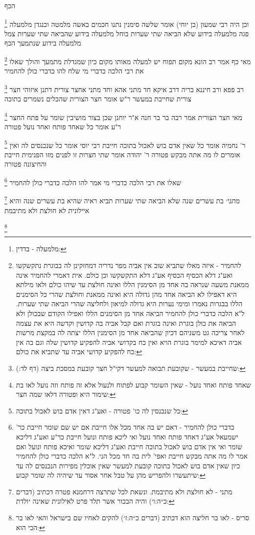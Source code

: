 \documentclass[12pt, openany]{book}
\newcommand{\footnotecomment}[1]{
	\renewcommand\thefootnote{}
	\footnote{#1}}
\newcommand{\commenta}[1]{\footnotecomment{#1}}
\begin{document}
{{הכף 
\commenta{מלמעלה - בדדין:}
וכן היה רבי שמעון (בן יוחי) אומר שלשה סימנין נתנו חכמים באשה מלמטה וכנגדן מלמעלה פגה מלמעלה בידוע שלא הביאה שתי שערות בוחל מלמעלה בידוע שהביאה שתי שערות צמל מלמעלה בידוע שנתמעך הכף 
\commenta{להחמיר - איזה מאלו שתביא שוב אין אביה מפר נדריה דמחזקינן לה בבוגרת נתקשקשו ואע"ג דלא הכסיף הכסיף אע"ג דלא התקשקשו וכן כולם. אית דאמרי להחמיר אינה ממאנת משעה שנראה בה אחד מן הסימנין הללו ואינה חולצת עד שיהו כולם ולאו מילתא היא דאפילו לא הביאה אחד מהן גדולה היא ואינה ממאנת וחולצת שהרי כל הסימנים הללו בבגרות נאמרו ומימי נערות היא גדולה למיאון ולחליצה שהרי הביאה שתי שערות. ל"א הלכה כדברי כולן להחמיר הביאה אחד מן הסימנים הללו ואפילו הקודם שבכולן ולא הביאה את כולן בוגרת ואינה בוגרת ואם קבל אביה בה קדושין וקדשה היא את עצמה לאחר צריכה גט משניהם דכיון שהביאה אחד מן הסימנין הללו יצתה לה במקצת מרשות אביה דאיכא למימר בוגרת הויא ואין כח בקדושי אביה להפקיע קדושין שלה וגם בה אין כח להפקיע קדושי אביה עד שתביא את כולם:}
מאי כף אמר רב הונא מקום תפוח יש למעלה מאותו מקום כיון שמגדלת מתמעך והולך שאלו את רבי הלכה כדברי מי שלח להו כדברי כולן להחמיר 
\commenta{שחייבת במעשר - שקובעת תבואה למעשר דקי"ל חצר קובעת במסכת ביצה (דף לד:):}
רב פפא ורב חיננא בריה דרב איקא חד מתני אהא וחד מתני אחצר צורית דתנן איזוהי חצר צורית שחייבת במעשר ר"ש אומר חצר הצורית שהכלים נשמרים בתוכה 
\commenta{שאחד פותח ואחד נועל - שאין השומר קבוע לפתוח ולנעול אלא זה פותח וזה נועל לאו בת שימור היא ופטורה דלאו שמה חצר:}
מאי חצר הצורית אמר רבה בר בר חנה א"ר יוחנן שכן בצור מושיבין שומר על פתח החצר ר"ע אומר כל שאחד פותח ואחד נועל פטורה 
\commenta{כל שנכנסין לה כו' פטורה - ואע"ג דאין אדם בוש לאכול בתוכה:}
ר' נחמיה אומר כל שאין אדם בוש לאכול בתוכה חייבת רבי יוסי אומר כל שנכנסים לה ואין אומרים לו מה אתה מבקש פטורה 
ר' יהודה אומר שתי חצרות זו לפנים מזו הפנימית חייבת והחיצונה פטורה 
\commenta{כדברי כולן להחמיר - דאם יש בה אחד מכל אלו חייבת אם יש שם שומר חייבת כר' ישמעאל אע"ג דאחד פותח ואחד נועל ואי ליכא פותח ונועל חייבת כר"ע ואע"ג דליכא שומר ואי אין אדם בוש לאכול בתוכה חייבת ואע"ג דליכא שומר ואיכא פותח ונועל ואם אמר לו מה אתה מבקש חייבת ואפי' לית בה חד מכל הני. ל"א הלכה כדברי כולן להחמיר כיון שאין אדם בוש לאכול בתוכה קובעת למעשר שאין אוכלין מפירות הנכנסים לה עד שיתעשרו ולהפריש מהן על טבל אחר אסור עד שיהיה לה שומר קבוע:}
שאלו את רבי הלכה כדברי מי אמר להו הלכה כדברי כולן להחמיר
\commenta{מתני - לא חולצת ולא מתיבמת. ונשאת לכל שתרצה דרחמנא פטרה דכתיב (דברים כ״ה:ו׳) והיה הבכור אשר תלד פרט לאילונית שאינה יולדת:}
{\large\emph{מתני׳}} בת עשרים שנה שלא הביאה שתי שערות תביא ראיה שהיא בת עשרים שנה והיא איילונית לא חולצת ולא מתיבמת
\commenta{סריס - לאו בר חליצה הוא דכתיב (דברים כ״ה:ז׳) להקים לאחיו שם בישראל והאי לאו בר הכי הוא:}
}}
\end{document}
